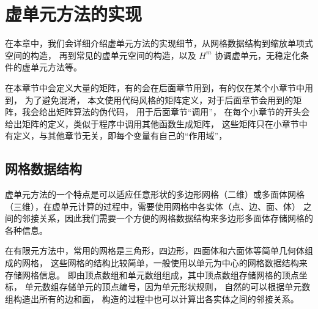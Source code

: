 \chapter{虚单元方法的实现}
在本章中，我们会详细介绍虚单元方法的实现细节，从网格数据结构到缩放单项式空间的构造，
再到常见的虚单元空间的构造，以及 $H^m$
协调虚单元，无稳定化条件的虚单元方法等。
%

在本章节中会定义大量的矩阵，有的会在后面章节用到，有的仅在某个小章节中用到，
为了避免混淆，
本文使用代码风格的矩阵定义，对于后面章节会用到的矩阵，我会给出矩阵算法的伪代码，
用于后面章节``调用''，
在每个小章节的开头会给出矩阵的定义，类似于程序中调用其他函数生成矩阵，
这些矩阵只在小章节中有定义，与其他章节无关，即每个变量有自己的``作用域''，

\section{网格数据结构}

虚单元方法的一个特点是可以适应任意形状的多边形网格（二维）或多面体网格
（三维），在虚单元计算的过程中，需要使用网格中各实体（点、边、面、体）
之间的邻接关系，因此我们需要一个方便的网格数据结构来多边形多面体存储网格的各种信息。

在有限元方法中，常用的网格是三角形，四边形，四面体和六面体等简单几何体组成的网格，
这些网格的结构比较简单，一般使用以单元为中心的网格数据结构来存储网格信息。
即由顶点数组和单元数组组成，其中顶点数组存储网格的顶点坐标，
单元数组存储单元的顶点编号，因为单元形状规则，
自然的可以根据单元数组构造出所有的边和面，
构造的过程中也可以计算出各实体之间的邻接关系。


